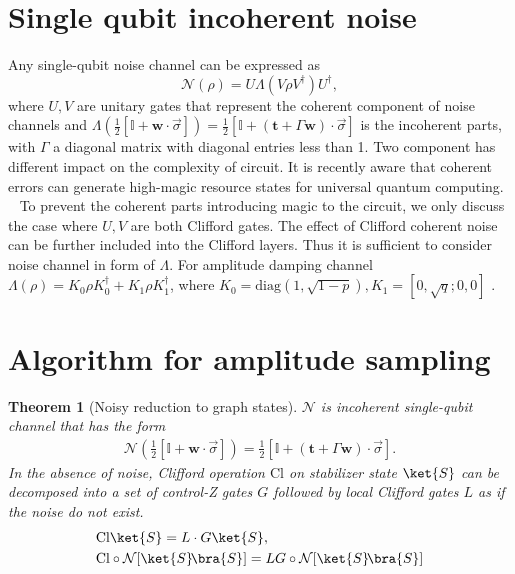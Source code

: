\documentclass[aps,%
twocolumn,%
floatfix,%
pra,%
amsfonts,%
longbibliography,%
groupedaddress,%
superscriptaddress]{revtex4-2}%
\newtheorem{theorem}{Theorem}
\newcommand{\1}{\mathbbm{1}}
\begin{document}
\section{ Single qubit incoherent noise}
Any single-qubit noise channel can be expressed as
\[
\mathcal{N}(\rho) = U \Lambda(V \rho V^\dagger)U^\dagger,
\]
where $U,V$ are unitary gates that represent the coherent component of noise channels and \(\Lambda\left(\frac{1}{2}[\mathbb{I} + \mathbf{w} \cdot \vec \sigma]\right) = \frac{1}{2}[\mathbb{I} + (\mathbf{t} + \Gamma\mathbf{w}) \cdot  \vec\sigma]\) is the incoherent parts, with \(\Gamma\) a diagonal matrix with diagonal entries less than 1.
Two component has different impact on the complexity of circuit. It is recently aware that coherent errors can generate high-magic resource states for universal quantum computing. ~\cite{niroula2024phase,turkeshi2024coherent}
To prevent the coherent parts introducing magic to the circuit, we only discuss the case where $U,V$ are both Clifford gates. The effect of Clifford coherent noise can be further included into the Clifford layers. Thus it is sufficient to consider noise channel in form of $\Lambda$. 
For amplitude damping channel $\Lambda(\rho) = K_0 \rho K_0^\dagger + K_1 \rho K_1^\dagger$, where $K_0 = \text{diag}(1, \sqrt{1 - p}), K_1 = [0,\sqrt{q}; 0,0]$ . 

\section{Algorithm for amplitude sampling}
\begin{theorem}[Noisy reduction to graph states]
\label{theo:Noisy_reduction}
 $\mathcal{N}$ is incoherent single-qubit channel that has the form
 \begin{align}
    \mathcal{N}\left(\frac{1}{2}[\mathbb{I} + \mathbf{w} \cdot \vec \sigma]\right) = \frac{1}{2}[\mathbb{I} + (\mathbf{t} + \Gamma\mathbf{w}) \cdot  \vec\sigma] .
 \end{align}
In the absence of noise, 
Clifford operation $\text{Cl}$ on stabilizer state $\ket{S}$ can be decomposed into a set of control-Z gates $G$  followed by local Clifford gates $L$  as if the noise do not exist.
\begin{align}
    &\text{Cl} \ket{S}= L \cdot G \ket{S}, \\
    &\text{Cl} \circ \mathcal{N}[\ket{S}\!\bra{S}] = LG \circ \mathcal{N}[\ket{S}\!\bra{S}]
\end{align}
\end{theorem}
\end{document}
